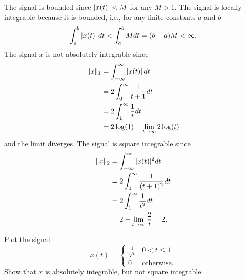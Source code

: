 \begin{excersizelist}
\begin{solution}
\begin{center}
\end{center}
The signal is bounded since $\left\vert x(t) \right\vert < M$ for any $M > 1$.  The signal is locally integrable because it is bounded, i.e., for any finite constants $a$ and $b$
\[
\int_{a}^b \left\vert x(t) \right\vert dt < \int_{a}^b M dt = (b-a)M < \infty.
\]
The signal $x$ is not absolutely integrable since
\begin{align*}
\|x\|_1 &= \int_{-\infty}^\infty \left\vert x(t) \right\vert dt \\
&= 2 \int_{0}^\infty \frac{1}{t+1} dt \\
&= 2 \int_{1}^\infty \frac{1}{t} dt \\
&= 2\log(1) + \lim_{t \to \infty} 2\log(t)
\end{align*}
and the limit diverges.  The signal is square integrable since
\begin{align*}
\|x\|_2 &= \int_{-\infty}^\infty \vert x(t) \vert^2 dt \\
&= 2 \int_{0}^\infty \frac{1}{(t+1)^2} dt \\
&= 2 \int_{1}^\infty \frac{1}{t^2} dt \\
&= 2 - \lim_{t \to \infty} \frac{2}{t} = 2.
\end{align*}
\end{solution}

\item \label{excer:absintnotsquareint} Plot the signal
\[
x(t) = \begin{cases}
\frac{1}{\sqrt{t}} & 0 < t \leq 1 \\
0 & \text{otherwise}.
\end{cases}
\]
Show that $x$ is absolutely integrable, but not square integrable.


\end{excersizelist}

